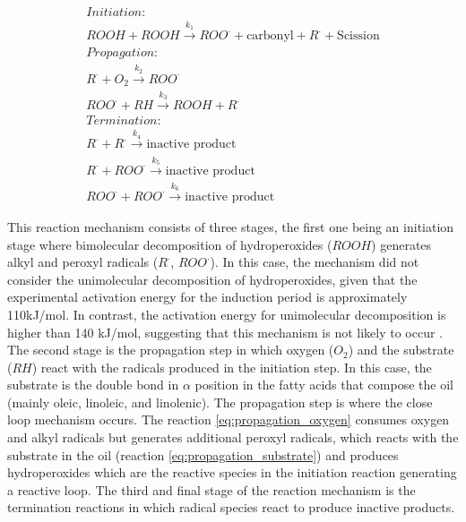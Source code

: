 \begin{refsection}
\begin{subequations}
\begin{gather}
    Initiation:\nonumber\\
    ROOH+ROOH \xrightarrow{k_1}ROO^\cdot+\text{carbonyl}+R^\cdot +\text{Scission}\\
    Propagation:\nonumber\\
    R^\cdot+O_2 \xrightarrow{k_2}ROO^\cdot \label{eq:propagation_oxygen}\\
    ROO^\cdot+ RH\xrightarrow{k_3}ROOH+R^\cdot \label{eq:propagation_substrate}\\
    Termination:\nonumber\\
    R^\cdot+R^\cdot \xrightarrow{k_4}\text{inactive product}\\
    R^\cdot+ROO^\cdot\xrightarrow{k_5}\text{inactive product}\\
    ROO^\cdot+ROO^\cdot\xrightarrow{k_6}\text{inactive product}
\end{gather}
\label{eq:reacciones_cinetica}
\end{subequations}

This reaction mechanism consists of three stages, the first one being an initiation stage where bimolecular decomposition of hydroperoxides ($ROOH$) generates alkyl and peroxyl radicals ($R^\cdot$, $ROO^\cdot$). In this case, the mechanism did not consider the unimolecular decomposition of hydroperoxides, given that the experimental activation energy for the induction period is approximately 110kJ/mol. In contrast, the activation energy for unimolecular decomposition is higher than 140 kJ/mol, suggesting that this mechanism is not likely to occur \cite{Richaud2012RateChemiluminescence,Denisov2005OxidationBiology}. The second stage is the propagation step in which oxygen ($O_2$) and the substrate ($RH$) react with the radicals produced in the initiation step. In this case, the substrate is the double bond in $\alpha$ position in the fatty acids
that compose the oil (mainly oleic, linoleic, and linolenic). The propagation step is where the close loop mechanism occurs. The reaction \ref{eq:propagation_oxygen} consumes oxygen and alkyl radicals but generates  additional peroxyl radicals, which reacts with the substrate in the oil (reaction \ref{eq:propagation_substrate}) and produces hydroperoxides which are the reactive species in the initiation reaction  generating a reactive loop. The third and final stage of the reaction mechanism is the termination reactions in which radical species react to produce inactive products. \\ 


\end{refsection}
